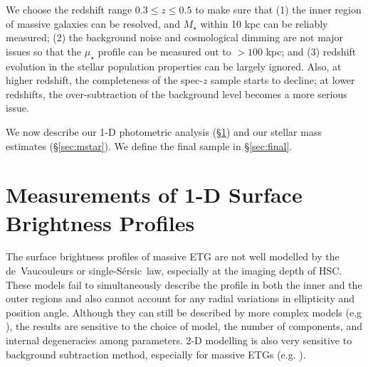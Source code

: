 \documentclass[fleqn,usenatbib]{mnras}
\def\ser{{S\'{e}rsic\ }}
\def\mstar{{$M_{\star}$}}
\def\mden{{$\mu_{\star}$}}
\begin{document}
    We choose the redshift range $0.3 \leq z \leq 0.5$ to make sure that  
    (1) the inner region of massive galaxies can be resolved, and \mstar{} within 
    10 kpc can be reliably measured; 
    (2) the background noise and cosmological dimming are not major issues so that 
    the \mden{} profile can be measured out to $>100$ kpc; and
    (3) redshift evolution in the stellar population properties can be largely 
    ignored.  
    Also, at higher redshift, the completeness of the spec-$z$ sample starts to 
    decline; at lower redshifts, the over-subtraction of the background level 
    becomes a more serious issue.  
   
    We now describe our 1-D photometric analysis 
    (\S \ref{sec:ellipse}) and our stellar mass estimates (\S \ref{sec:mstar}). 
    We define the final sample in \S \ref{sec:final}.

\section{Measurements of 1-D Surface Brightness Profiles}
    \label{sec:ellipse}
    
    The surface brightness profiles of massive ETG are not well modelled by the 
    de~Vaucouleurs or single-\ser law, especially at the imaging depth of HSC.
    These models fail to simultaneously describe the profile in both the inner 
    and the outer regions and also cannot account for any radial variations in 
    ellipticity and position angle. 
    Although they can still be described by more complex models 
    (e.g \citealt{Huang2013a, Huang2013b, Oh2017}), the results are 
    sensitive to the choice of model, the number of components, and internal 
    degeneracies among parameters. 
    2-D modelling is also very sensitive to background subtraction method, 
    especially for massive ETGs (e.g. \citealt{Huang2013a}).
    
\end{document}
